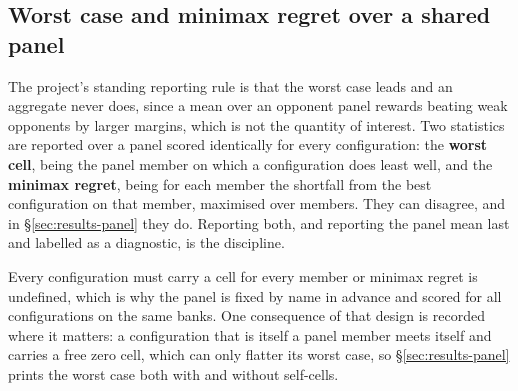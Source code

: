 \subsection{Worst case and minimax regret over a shared panel}
\label{sec:evaluation-panel}

The project's standing reporting rule is that the worst case leads and an aggregate never does, since
a mean over an opponent panel rewards beating weak opponents by larger margins, which is not the
quantity of interest. Two statistics are reported over a panel scored identically for every
configuration: the \textbf{worst cell}, being the panel member on which a configuration does least
well, and the \textbf{minimax regret}, being for each member the shortfall from the best configuration
on that member, maximised over members. They can disagree, and in \S\ref{sec:results-panel} they do.
Reporting both, and reporting the panel mean last and labelled as a diagnostic, is the discipline.

Every configuration must carry a cell for every member or minimax regret is undefined, which is why
the panel is fixed by name in advance and scored for all configurations on the same banks. One
consequence of that design is recorded where it matters: a configuration that is itself a panel
member meets itself and carries a free zero cell, which can only flatter its worst case, so
\S\ref{sec:results-panel} prints the worst case both with and without self-cells.
